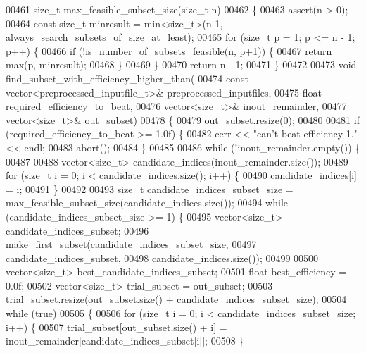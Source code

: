 \begin{DoxyCode}
{{00461 \textcolor{keywordtype}{size\_t} max\_feasible\_subset\_size(\textcolor{keywordtype}{size\_t} n)
00462 \{
00463   assert(n > 0);
00464   \textcolor{keyword}{const} \textcolor{keywordtype}{size\_t} minresult = min<size\_t>(n-1, always\_search\_subsets\_of\_size\_at\_least);
00465   \textcolor{keywordflow}{for} (\textcolor{keywordtype}{size\_t} p = 1; p <= n - 1; p++) \{
00466     \textcolor{keywordflow}{if} (!is\_number\_of\_subsets\_feasible(n, p+1)) \{
00467       \textcolor{keywordflow}{return} max(p, minresult);
00468     \}
00469   \}
00470   \textcolor{keywordflow}{return} n - 1;
00471 \}
00472 
00473 \textcolor{keywordtype}{void} find\_subset\_with\_efficiency\_higher\_than(
00474        \textcolor{keyword}{const} vector<preprocessed\_inputfile\_t>& preprocessed\_inputfiles,
00475        \textcolor{keywordtype}{float} required\_efficiency\_to\_beat,
00476        vector<size\_t>& inout\_remainder,
00477        vector<size\_t>& out\_subset)
00478 \{
00479   out\_subset.resize(0);
00480 
00481   \textcolor{keywordflow}{if} (required\_efficiency\_to\_beat >= 1.0f) \{
00482     cerr << \textcolor{stringliteral}{"can't beat efficiency 1."} << endl;
00483     abort();
00484   \}
00485 
00486   \textcolor{keywordflow}{while} (!inout\_remainder.empty()) \{
00487 
00488     vector<size\_t> candidate\_indices(inout\_remainder.size());
00489     \textcolor{keywordflow}{for} (\textcolor{keywordtype}{size\_t} i = 0; i < candidate\_indices.size(); i++) \{
00490       candidate\_indices[i] = i;
00491     \}
00492 
00493     \textcolor{keywordtype}{size\_t} candidate\_indices\_subset\_size = max\_feasible\_subset\_size(candidate\_indices.size());
00494     \textcolor{keywordflow}{while} (candidate\_indices\_subset\_size >= 1) \{
00495       vector<size\_t> candidate\_indices\_subset;
00496       make\_first\_subset(candidate\_indices\_subset\_size,
00497                         candidate\_indices\_subset,
00498                         candidate\_indices.size());
00499 
00500       vector<size\_t> best\_candidate\_indices\_subset;
00501       \textcolor{keywordtype}{float} best\_efficiency = 0.0f;
00502       vector<size\_t> trial\_subset = out\_subset;
00503       trial\_subset.resize(out\_subset.size() + candidate\_indices\_subset\_size);
00504       \textcolor{keywordflow}{while} (\textcolor{keyword}{true})
00505       \{
00506         \textcolor{keywordflow}{for} (\textcolor{keywordtype}{size\_t} i = 0; i < candidate\_indices\_subset\_size; i++) \{
00507           trial\_subset[out\_subset.size() + i] = inout\_remainder[candidate\_indices\_subset[i]];
00508         \}
}}
\end{DoxyCode}
